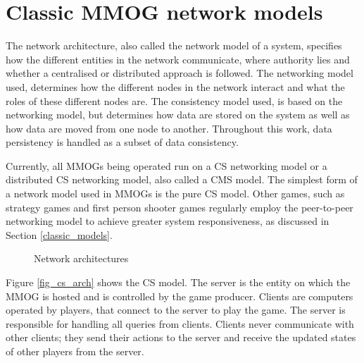 \documentclass[journal,oneside,a4paper,onecolumn]{IEEEtran}
\begin{document}
\section{Classic MMOG network models}
\label{classic_network_models}

The network architecture, also called the network model of a system, specifies how the different entities in the network communicate, where authority lies and whether a centralised or distributed approach is followed. The networking model used, determines how the different nodes in the network interact and what the roles of these different nodes are. The consistency model used, is based on the networking model, but determines how data are stored on the system as well as how data are moved from one node to another. Throughout this work, data persistency is handled as a subset of data consistency.

Currently, all MMOGs being operated run on a \ac{CS} networking model or a distributed \ac{CS} networking model, also called a \ac{CMS} model. The simplest form of a network model used in MMOGs is the pure \ac{CS} model. Other games, such as strategy games and first person shooter games regularly employ the peer-to-peer networking model to achieve greater system responsiveness, as discussed in Section \ref{classic_models}.

\begin{figure}[htbp]
\centering
\caption{Network architectures}
\end{figure}
%
Figure \ref{fig_cs_arch} shows the \ac{CS} model. The server is the entity on which the MMOG is hosted and is controlled by the game producer. Clients are computers operated by players, that connect to the server to play the game. The server is responsible for handling all queries from clients. Clients never communicate with other clients; they send their actions to the server and receive the updated states of other players from the server.
\end{document}
